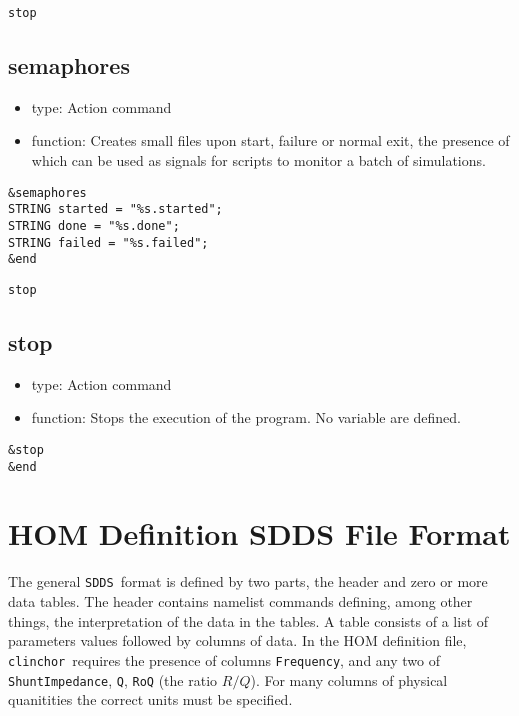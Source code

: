 \documentclass[11pt]{article}
\newcommand{\clinchor}{{\tt clinchor}}
\newcommand{\SDDS}{{\tt SDDS}}
\begin{document}
\newpage
\begin{center}{\tt stop}\end{center}
\subsection{semaphores}

\begin{itemize}
\item type: Action command
\item function: Creates small files upon start, failure or normal exit, the presence of which can be used as signals for scripts to monitor a batch of simulations.
\end{itemize}
\begin{verbatim}
&semaphores
STRING started = "%s.started";
STRING done = "%s.done";
STRING failed = "%s.failed";
&end
\end{verbatim}



\newpage
\begin{center}{\tt stop}\end{center}
\subsection{stop}

\begin{itemize}
\item type: Action command
\item function: Stops the execution of the program. No variable are defined.
\end{itemize}
\begin{verbatim}
&stop
&end
\end{verbatim}

\section{HOM Definition SDDS File Format} \label{sect:HOM file definition}
The general \SDDS\ format is defined by two parts, the header and zero
or more data tables.  The header contains namelist commands defining,
among other things, the interpretation of the data in the tables. A
table consists of a list of parameters values followed by columns of
data. In the HOM definition file, \clinchor\ requires the presence of
columns {\tt Frequency}, and any two of {\tt ShuntImpedance}, {\tt Q},
{\tt RoQ} (the ratio $R/Q$). 
For many columns of physical quanitities the correct units must be specified.
\end{document}

